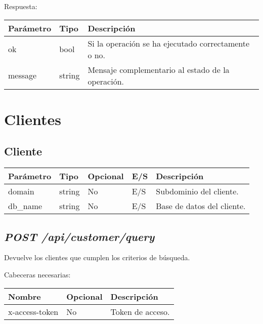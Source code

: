 Respuesta:
\begin{table}[!h]
	\centering
	\begin{adjustbox}{max width=\textwidth}
	\begin{tabular}{|l|l|l|}
		\hline
		Parámetro & Tipo & Descripción \\ \hline
		ok & bool & Si la operación se ha ejecutado correctamente o no. \\ \hline
		message & string & Mensaje complementario al estado de la operación. \\ \hline
	\end{tabular}
\end{adjustbox}
\end{table}




\section{Clientes}

\subsection{Cliente}
\begin{table}[!h]
	\centering
	\begin{adjustbox}{max width=\textwidth}
	\begin{tabular}{|l|l|l|l|l|}
		\hline
		Parámetro & Tipo & Opcional & E/S & Descripción \\ \hline
		domain & string & No & E/S & Subdominio del cliente. \\ \hline
		db\_name & string & No & E/S & Base de datos del cliente. \\ \hline
	\end{tabular}
\end{adjustbox}
\end{table}


\subsection{\textit{POST /api/customer/query}}
Devuelve los clientes que cumplen los criterios de búsqueda.

Cabeceras necesarias:
\begin{table}[h!]
	\centering
	\begin{adjustbox}{max width=\textwidth}
	\begin{tabular}{|l|l|l|}
		\hline
		Nombre & Opcional & Descripción \\ \hline
		x-access-token & No & Token de acceso. \\ \hline
	\end{tabular}
\end{adjustbox}
\end{table}


